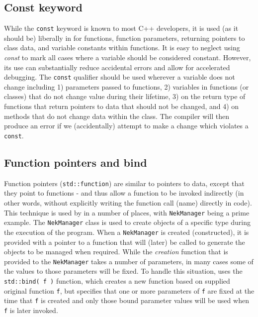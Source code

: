 \subsection{Const keyword}
While the \lstinline{const} keyword is known to most C++
developers, it is used (as it should be) liberally in {\nek} for functions,
function parameters, returning pointers to class data, and variable
constants within functions.  It is easy to neglect using \emph{const}
to mark all cases where a variable should be considered constant.
However, its use can substantially reduce accidental errors and
allow for accelerated debugging. The \lstinline{const} qualifier should be used wherever a variable does not change including 1) parameters passed to
functions, 2) variables in functions (or classes) that do not change
value during their lifetime, 3) on the return type of functions that return pointers to data that should not be changed, and 4) on methods that do not
change data within the class. The compiler will then produce an error if we (accidentally) attempt to make a change which violates a \lstinline{const}.

\subsection{Function pointers and bind}
Function pointers
  (\lstinline{std::function}) are similar to pointers to data, except that
  they point to functions - and thus allow a function to be invoked
  indirectly (in other words, without explicitly writing the function
  call (name) directly in code).  This technique is used by {\nek}
  in a number of places, with \lstinline{NekManager} being a prime example.
  The \lstinline{NekManager} class is used to create objects of a specific
  type during the execution of the program.  When a \lstinline{NekManager} is
  created (constructed), it is provided with a pointer to a function
  that will (later) be called to generate the objects to be managed when required.  While
  the \emph{creation} function that is provided to the \lstinline{NekManager}
  takes a number of parameters, in many cases some of the values to
  those parameters will be fixed.  To handle this situation, {\nek}
  uses the \lstinline{std::bind( f )} function, which creates a new function
  based on supplied original function \lstinline{f}, but specifies that one
  or more parameters of \lstinline{f} are fixed at the time that \lstinline{f} is created and only those bound parameter values will be used when
  \lstinline{f} is later invoked.  


